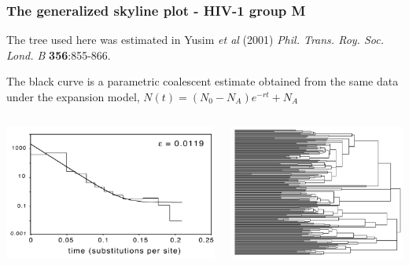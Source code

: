 \begin{frame}
\frametitle{The generalized skyline plot - HIV-1 group M}


The tree used here was estimated in Yusim {\it et al} (2001) {\it Phil. Trans. Roy. Soc. Lond. B} {\bf 356}:855-866.

The black curve is a parametric coalescent estimate obtained from the same data under the expansion model, \small{$N(t) = (N_0-N_A)e^{-rt}+N_A$}

\bigskip

\begin{columns}[b]


\includegraphics[scale=0.2]{../common/images/skylinePlotHIV}


\includegraphics[scale=0.2]{../common/images/skylineTreeHIV}

\end{columns}

\end{frame}
